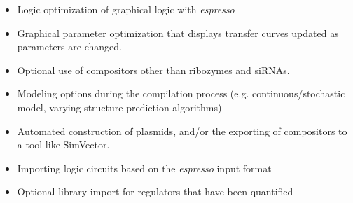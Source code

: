 \documentclass[11pt]{article}
\begin{document}
\begin{itemize}
\item Logic optimization of graphical logic with \emph{espresso}
\item Graphical parameter optimization that displays transfer curves 
  updated as parameters are changed.
\item Optional use of compositors other than ribozymes and siRNAs.
\item Modeling options during the compilation process (e.g. continuous/stochastic
  model, varying structure prediction algorithms)
\item Automated construction of plasmids, and/or the exporting of compositors to a
  tool like SimVector.
\item Importing logic circuits based on the \emph{espresso} input format 
\item Optional library import for regulators that have been quantified
\end{itemize}
 

\newpage
  
\end{document}
